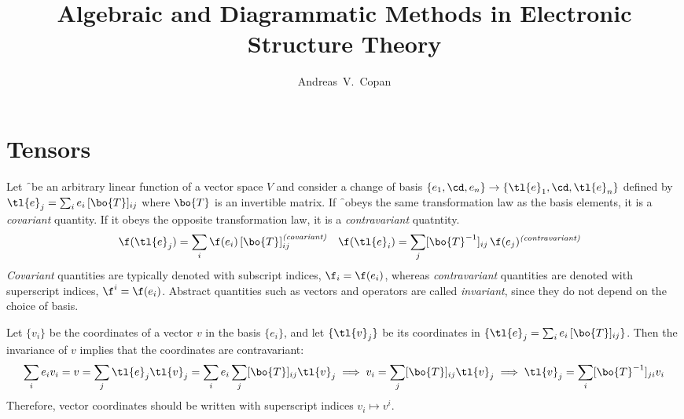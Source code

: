 \documentclass[11pt,fleqn]{article}
\makeatletter
\numberwithin{equation}{section}
\renewcommand\tableofcontents{%
  \@starttoc{toc}%
}
\makeatother
\begin{document}
\title{Algebraic and Diagrammatic Methods in Electronic Structure Theory}
\author{Andreas~V.~Copan}
\date{}

\maketitle
\tableofcontents

\section{Tensors}\label{sec-tensors}

\begin{dfn}\label{covariance-contravariance-invariance}
Let \f\ be an arbitrary linear function of a vector space $V$ and consider a change of basis $\{e_1,\cd,e_n\}\rightarrow\{\tl{e}_1,\cd,\tl{e}_n\}$ defined by $\tl{e}_j = \sum_ie_i\,[\bo{T}]_{ij}$ where $\bo{T}$ is an invertible matrix.
If \f\ obeys the same transformation law as the basis elements, it is a \textit{covariant} quantity.
If it obeys the opposite transformation law, it is a \textit{contravariant} quatntity.
\begin{align}
&&
  \f(\tl{e}_j)=\sum_i\f(e_i)\,[\bo{T}]_{ij}
\sp\text{\textit{(covariant)}}
&&
  \f(\tl{e}_i)=\sum_j[\bo{T}^{-1}]_{ij}\,\f(e_j)
\sp\text{\textit{(contravariant)}}
\end{align}
\textit{Covariant} quantities are typically denoted with subscript indices, $\f_i=\f(e_i)$, whereas \textit{contravariant} quantities are denoted with superscript indices, $\f^i=\f(e_i)$.
Abstract quantities such as vectors and operators are called \textit{invariant}, since they do not depend on the choice of basis.
\end{dfn}

\begin{ex}\label{vector-coordinates-are-contravariant}
Let $\{v_i\}$ be the coordinates of a vector $v$ in the basis $\{e_i\}$, and let $\{\tl{v}_j\}$ be its coordinates in $\{\tl{e}_j=\sum_ie_i\,[\bo{T}]_{ij}\}$.
Then the invariance of $v$ implies that the coordinates are contravariant:
\begin{align*}
  \sum_ie_iv_i=v=\sum_j\tl{e}_j\tl{v}_j
=
  \sum_ie_i\sum_j[\bo{T}]_{ij}\tl{v}_j
\implies
  v_i
=
  \sum_j[\bo{T}]_{ij}\tl{v}_j
\implies
  \tl{v}_j
=
  \sum_i[\bo{T}^{-1}]_{ji}v_i
\end{align*}
Therefore, vector coordinates should be written with superscript indices $v_i\mapsto v^i$.
\end{ex}
\end{document}
